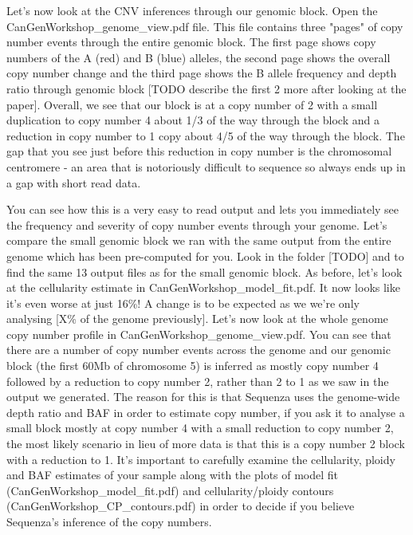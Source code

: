 Let's now look at the CNV inferences through our genomic block. Open the CanGenWorkshop\_genome\_view.pdf file. This file contains three "pages" of copy number events through the entire genomic block. The first page shows copy numbers of the A (red) and B (blue) alleles, the second page shows the overall copy number change and the third page shows the B allele frequency and depth ratio through genomic block [TODO describe the first 2 more after looking at the paper]. Overall, we see that our block is at a copy number of 2 with a small duplication to copy number 4 about 1/3 of the way through the block and a reduction in copy number to 1 copy about 4/5 of the way through the block. The gap that you see just before this reduction in copy number is the chromosomal centromere - an area that is notoriously difficult to sequence so always ends up in a gap with short read data.

You can see how this is a very easy to read output and lets you immediately see the frequency and severity of copy number events through your genome. Let's compare the small genomic block we ran with the same output from the entire genome which has been pre-computed for you. Look in the folder [TODO] and to find the same 13 output files as for the small genomic block. As before, let's look at the cellularity estimate in CanGenWorkshop_model_fit.pdf. It now looks like it's even worse at just 16\%! A change is to be expected as we we're only analysing [X\% of the genome previously]. Let's now look at the whole genome copy number profile in CanGenWorkshop_genome_view.pdf. You can see that there are a number of copy number events across the genome and our genomic block (the first 60Mb of chromosome 5) is inferred as mostly copy number 4 followed by a reduction to copy number 2, rather than 2 to 1 as we saw in the output we generated. The reason for this is that Sequenza uses the genome-wide depth ratio and BAF in order to estimate copy number, if you ask it to analyse a small block mostly at copy number 4 with a small reduction to copy number 2, the most likely scenario in lieu of more data is that this is a copy number 2 block with a reduction to 1. It's important to carefully examine the cellularity, ploidy and BAF estimates of your sample along with the plots of model fit (CanGenWorkshop_model_fit.pdf) and cellularity/ploidy contours (CanGenWorkshop_CP_contours.pdf) in order to decide if you believe Sequenza's inference of the copy numbers.


